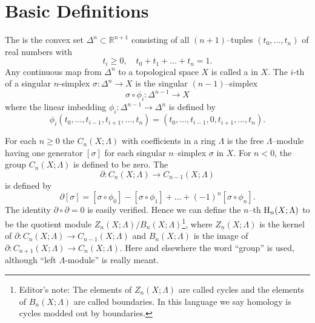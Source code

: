 \documentclass[../main]{subfiles}
\begin{document}
\section{Basic Definitions}\label{sec:A.1}
The  is the convex set $\Delta^n \subset {\mathbb R}^{n + 1}$ consisting of all $(n + 1)$--tuples $(t_0, \ldots, t_n)$ of real numbers with \[t_i \ge 0, \quad t_0 + t_1 + \ldots + t_n = 1.\] Any continuous map from $\Delta^n$ to a topological space $X$ is called a  in $X$. The $i$-th  of a singular $n$-simplex $\sigma : \Delta^n \longrightarrow X$ is the singular $(n - 1)$--simplex \[\sigma \circ \phi_i : \Delta^{n - 1} \longrightarrow X\] where the linear imbedding $\phi_i : \Delta^{n - 1} \longrightarrow \Delta^n$ is defined by \[\phi_i(t_0, \ldots, t_{i - 1}, t_{i + 1}, \ldots, t_n) = (t_0, \ldots, t_{i - 1}, 0, t_{i + 1}, \ldots, t_n).\]

For each $n \ge 0$ the  $C_n(X; \Lambda)$ with coefficients in a  ring $\Lambda$ is the free $\Lambda$--module having one generator $[\sigma]$ for each singular $n$--simplex $\sigma$ in $X$. For $n < 0$, the group $C_n(X; \Lambda)$ is defined to be zero. The  \[\partial : C_n(X; \Lambda) \longrightarrow C_{n - 1}(X; \Lambda)\] is defined by \[\partial[\sigma] = [\sigma \circ \phi_0] - [\sigma \circ \phi_1] + \ldots + (-1)^n [\sigma \circ \phi_n].\] 
The identity $\partial \circ \partial = 0$ is easily verified. Hence we can define the $n$--th  $\operatorname{H}_n(X; \Lambda)$ to be the quotient module $Z_n(X; \Lambda)/B_n(X; \Lambda)$\footnote{Editor's note: The elements of $Z_n(X;\Lambda)$ are called cycles and the elements of $B_n(X;\Lambda)$ are called boundaries. In this language we say homology is cycles modded out by boundaries.}, where $Z_n(X; \Lambda)$ is the kernel of $\partial : C_n(X; \Lambda) \longrightarrow C_{n - 1}(X; \Lambda)$ and $B_n(X; \Lambda)$ is the image of $\partial : C_{n + 1}(X; \Lambda) \longrightarrow C_n(X; \Lambda)$. Here and elsewhere the word ``group'' is used, although ``left $\Lambda$-module'' is really meant.
\end{document}
